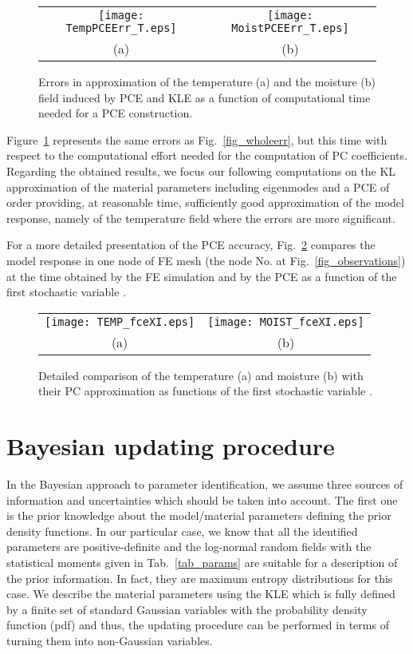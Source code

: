 \documentclass[preprint,12pt]{elsarticle}
\begin{document}
\begin{figure} [ht!]
\centering
\begin{tabular}{cc}
\texttt{[image: TempPCEErr\_T.eps]}&
\texttt{[image: MoistPCEErr\_T.eps]}\\
(a)&(b)
\end{tabular}
\caption{ Errors in approximation of the temperature (a) and the
  moisture (b) field induced by PCE and KLE as a function of
  computational time needed for a PCE construction.}
\label{fig_wholeerr_time}
\end{figure}
Figure~\ref{fig_wholeerr_time} represents the same errors
 as Fig.~\ref{fig_wholeerr}, but this time
with respect to the computational effort needed for the
computation of PC coefficients. Regarding the obtained results, we
focus our following computations on the KL approximation of the
material parameters including  eigenmodes and a PCE of order
 providing, at reasonable time, sufficiently good
approximation of the model response, namely of the temperature
field where the errors are more significant.

For a more detailed presentation of the PCE accuracy,
Fig.~\ref{fig_pceerr_detail} compares the model response in one node
of FE mesh (the node No.  at Fig.~\ref{fig_observations}) at the
time  obtained by the FE simulation and by the
PCE as a function of the first stochastic variable .
\begin{figure} [ht!]
\centering
\begin{tabular}{cc}
\texttt{[image: TEMP\_fceXI.eps]}&
\texttt{[image: MOIST\_fceXI.eps]}\\
(a)&(b)
\end{tabular}
\caption{Detailed comparison of the temperature (a) and moisture (b)
  with their PC approximation as functions of the first stochastic variable
  .}
\label{fig_pceerr_detail}
\end{figure}


\section{Bayesian updating procedure}
\label{sec:bayes}

In the Bayesian approach to parameter identification, we assume
three sources of information and uncertainties which should be
taken into account. The first one is the prior knowledge about the
model/material parameters  defining the prior density
functions. In our particular case, we know that all the identified
parameters are positive-definite and the log-normal random fields
with the statistical moments given in Tab.~\ref{tab_params} are
suitable for a description of the prior information. In fact, they
are maximum entropy distributions for this case. We describe the
material parameters using the KLE which is fully defined by a
finite set of standard Gaussian variables  with the probability
density function (pdf)  and thus, the
updating procedure can be performed in terms of 
turning them into non-Gaussian variables.
\end{document}
